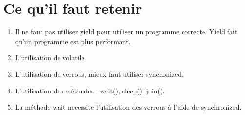 \documentclass{article}
\begin{document}
\section{Ce qu'il faut retenir}
\begin{enumerate}
\item Il ne faut pas utiliser yield pour utiliser un programme correcte. Yield fait qu'un programme est plus performant.
\item L'utilisation de volatile.
\item L'utilisation de verrous, mieux faut utiliser synchonized.
\item L'utilisation des méthodes : wait(), sleep(), join().
\item La méthode wait necessite l'utilisation des verrous à l'aide de synchronized.
\end{enumerate}
\end{document}
